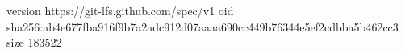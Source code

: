 version https://git-lfs.github.com/spec/v1
oid sha256:ab4e677fba916f9b7a2adc912d07aaaa690cc449b76344e5ef2cdbba5b462cc3
size 183522
